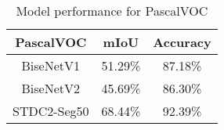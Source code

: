 \begin{table}[]
\centering
\begin{tabular}{ccc}
\hline
{\textbf{PascalVOC}}    & mIoU          & Accuracy                      \\ \hline
{BiseNetV1}             & 51.29\%       & 87.18\%                       \\ \hline
{BiseNetV2}             & 45.69\%       & 86.30\%                       \\ \hline
{STDC2-Seg50}           & 68.44\%       & 92.39\%                       \\ \hline

\end{tabular}
\caption{Model performance for PascalVOC}
\label{tab:parametersSTDC2}
\end{table}